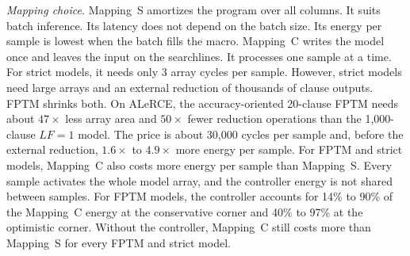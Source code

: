 \documentclass[preprint,12pt]{elsarticle}
\newcommand{\hyp}[1]{#1}
\newcommand{\LF}{\mathit{LF}}
\begin{document}
\textit{Mapping choice.} Mapping~S amortizes the program over all columns. It suits batch inference. Its latency does not depend on the batch size. \hyp{Its energy per sample is lowest when the batch fills the macro.}
Mapping~C writes the model once and leaves the input on the searchlines. It processes one sample at a time. For strict models, it needs only 3 array cycles per sample. However, strict models need large arrays and an external reduction of thousands of clause outputs.
FPTM shrinks both. On ALeRCE, the accuracy-oriented 20-clause FPTM needs about $47\times$ less array area and $50\times$ fewer reduction operations than the 1,000-clause $\LF=1$ model. The price is about 30,000 cycles per sample {and, before the external reduction, \hyp{$1.6\times$ to $4.9\times$} more energy per sample}.
For FPTM and strict models, Mapping~C also costs more energy per sample than Mapping~S. Every sample activates the whole model array, and the controller energy is not shared between samples. \hyp{For FPTM models, the controller accounts for 14\% to 90\% of the Mapping~C energy at the conservative corner and 40\% to 97\% at the optimistic corner. Without the controller, Mapping~C still costs more than Mapping~S for every FPTM and strict model.}
\end{document}

